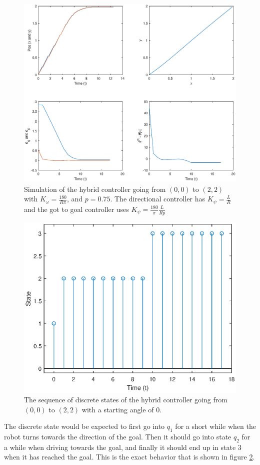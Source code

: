 \begin{figure}[H]
    \centering
    \includegraphics[width=\textwidth]{figs/perf-hybrid.eps}
    \caption{Simulation of the hybrid controller going from $(0, 0)$ to $(2, 2)$ with $K_\omega = \frac{180}{R\pi}$, and $p = 0.75.$ The directional controller has $K_\psi = \frac{L}{R}$ and the got to goal controller uses $K_\psi = \frac{180}{\pi} \frac{L}{Rp}$} \label{fig:perf-hybrid}
\end{figure}

\begin{figure}[H]
    \centering
    \includegraphics[width=\textwidth]{figs/state.eps}
    \caption{The sequence of discrete states of the hybrid controller going from $(0, 0)$ to $(2, 2)$ with a starting angle of 0. } \label{fig:states}
\end{figure}

The discrete state would be expected to first go into $q_1$ for a short while when the robot turns towards the direction of the goal. Then it should go into state $q_2$ for a while when driving towards the goal, and finally it should end up in state 3 when it has reached the goal. This is the exact behavior that is shown in figure \ref{fig:states}.